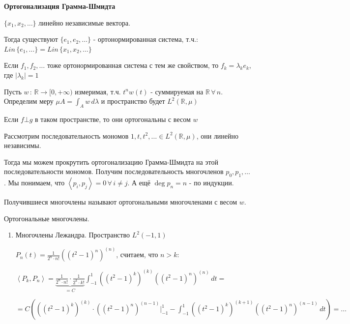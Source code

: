 \begin{remark}
    \textbf{Ортогонализация Грамма-Шмидта}

    $\{ x_1, x_2, \ldots \}$ линейно независимые вектора.

    Тогда существуют $\{ e_1, e_2, \ldots  \}$ - ортонормированная система, т.ч.:
    $Lin \, \{ e_1, \ldots \} = Lin \, \{ x_1, x_2, \ldots \}$

    Если $f_1, f_2, \ldots$ тоже ортонормированная система с тем же свойством, то 
    $f_k = \lambda_k e_k$, где $|\lambda_k| = 1$
    
    \begin{remark}
        Пусть $w \, : \, \mathbb{R} \rightarrow [0, +\infty)$ измеримая,
        т.ч. $t^n w(t)$ - суммируемая на $\mathbb{R} \, \forall \, n$. Определим меру $\mu A = \int_A w \, d\lambda$ и пространство будет $L^2 (\mathbb{R}, \mu)$

        Если $f \bot g$ в таком пространстве, то они ортогональны с весом $w$

        Рассмотрим последовательность мономов $1, t, t^2, \ldots \in L^2 (\mathbb{R}, \mu)$, они линейно независимы.

        Тогда мы можем прокрутить ортогонализацию Грамма-Шмидта на этой последовательности мономов. Получим последовательность многочленов $p_0, p_1, \ldots$.
        Мы понимаем, что $\left < p_i, p_j \right > = 0 \, \forall \, i \neq j$. А ещё $\deg p_n = n$ - по индукции.

        Получившиеся многочлены называют ортогональными многочленами с весом $w$.

        \begin{example}
            Ортогональные многочлены.

            \begin{enumerate}
                \item {
                    Многочлены Лежандра. Пространство $L^2 (-1, 1)$

                    $P_n (t) = \frac{1}{2^n \cdot n!} ((t^2 - 1)^n)^{(n)}$, считаем, что $n > k$:

                    $\left < P_k, P_n \right > = \underbrace{\frac{1}{2^n \cdot n!} \cdot \frac{1}{2^k \cdot k!}}_{=C} \int_{-1}^1 ((t^2 - 1)^k)^{(k)} ((t^2 - 1)^n)^{(n)} \, dt =$
                    
                    $= C \left( ((t^2 - 1)^k)^{(k)} \cdot ((t^2 - 1)^n)^{(n - 1)} \bigg |_{-1}^1 - \int_{-1}^1 ((t^2 - 1)^k)^{(k + 1)} ((t^2 - 1)^n)^{(n - 1)} \, dt \right) = \ldots$
                    
}
\end{enumerate}
\end{example}
\end{remark}
\end{remark}
